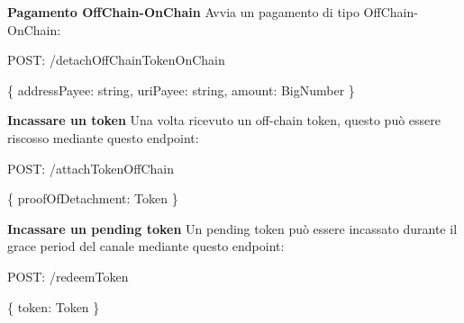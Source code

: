 \documentclass[12pt,italian,]{book}
\newenvironment{Shaded}{}{}
\newcommand{\DataTypeTok}[1]{\textcolor[rgb]{0.56,0.13,0.00}{#1}}
\newcommand{\NormalTok}[1]{#1}
\newcommand{\OperatorTok}[1]{\textcolor[rgb]{0.40,0.40,0.40}{#1}}
\newcommand{\SpecialStringTok}[1]{\textcolor[rgb]{0.73,0.40,0.53}{#1}}
\begin{document}
\textbf{\textbf{Pagamento OffChain-OnChain}} Avvia un pagamento di tipo OffChain-OnChain:

\begin{Shaded}
\begin{Highlighting}[]
\NormalTok{POST}\OperatorTok{:} \SpecialStringTok{/detachOffChainTokenOnChain}
\end{Highlighting}
\end{Shaded}

\begin{Shaded}
\begin{Highlighting}[]
\OperatorTok{\{}
    \DataTypeTok{addressPayee}\OperatorTok{:}\NormalTok{ string}\OperatorTok{,}
    \DataTypeTok{uriPayee}\OperatorTok{:}\NormalTok{ string}\OperatorTok{,}
    \DataTypeTok{amount}\OperatorTok{:}\NormalTok{ BigNumber}
\OperatorTok{\}}
\end{Highlighting}
\end{Shaded}

\textbf{\textbf{Incassare un token}} Una volta ricevuto un off-chain token, questo può essere riscosso mediante questo endpoint:

\begin{Shaded}
\begin{Highlighting}[]
\NormalTok{POST}\OperatorTok{:} \SpecialStringTok{/attachTokenOffChain}
\end{Highlighting}
\end{Shaded}

\begin{Shaded}
\begin{Highlighting}[]
\OperatorTok{\{}
    \DataTypeTok{proofOfDetachment}\OperatorTok{:}\NormalTok{ Token}
\OperatorTok{\}}
\end{Highlighting}
\end{Shaded}

\textbf{\textbf{Incassare un pending token}} Un pending token può essere incassato durante il grace period del canale mediante questo endpoint:

\begin{Shaded}
\begin{Highlighting}[]
\NormalTok{POST}\OperatorTok{:} \SpecialStringTok{/redeemToken}
\end{Highlighting}
\end{Shaded}

\begin{Shaded}
\begin{Highlighting}[]
\OperatorTok{\{}
    \DataTypeTok{token}\OperatorTok{:}\NormalTok{ Token}
\OperatorTok{\}}
\end{Highlighting}
\end{Shaded}
\end{document}
